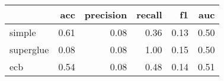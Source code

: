 \begin{tabular}{lrrrrr}
\toprule
{} &  acc &  precision &  recall &   f1 &  auc \\
\midrule
simple    & 0.61 &       0.08 &    0.36 & 0.13 & 0.50 \\
superglue & 0.08 &       0.08 &    1.00 & 0.15 & 0.50 \\
ecb       & 0.54 &       0.08 &    0.48 & 0.14 & 0.51 \\
\bottomrule
\end{tabular}
